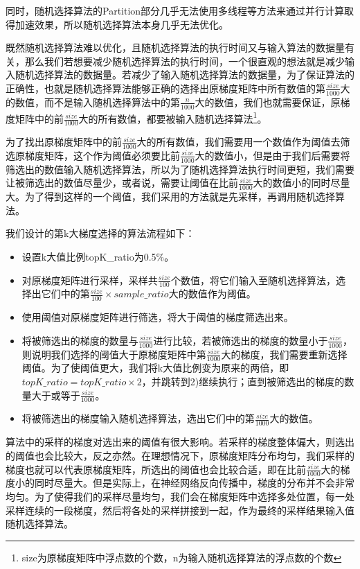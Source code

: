 同时，随机选择算法的Partition部分几乎无法使用多线程等方法来通过并行计算取得加速效果，所以随机选择算法本身几乎无法优化。

既然随机选择算法难以优化，且随机选择算法的执行时间又与输入算法的数据量有关，那么我们若想要减少随机选择算法的执行时间，一个很直观的想法就是减少输入随机选择算法的数据量。若减少了输入随机选择算法的数据量，为了保证算法的正确性，也就是随机选择算法能够正确的选择出原梯度矩阵中所有数值的第$\frac{size}{1000}$大的数值，而不是输入随机选择算法中的第$\frac{n}{1000}$大的数值，我们也就需要保证，原梯度矩阵中的前$\frac{size}{1000}$大的所有数值，都要被输入随机选择算法\footnote{size为原梯度矩阵中浮点数的个数，n为输入随机选择算法的浮点数的个数}。

为了找出原梯度矩阵中的前$\frac{size}{1000}$大的所有数值，我们需要用一个数值作为阈值去筛选原梯度矩阵，这个作为阈值必须要比前$\frac{size}{1000}$大的数值小，但是由于我们后需要将筛选出的数值输入随机选择算法，所以为了随机选择算法执行时间更短，我们需要让被筛选出的数值尽量少，或者说，需要让阈值在比前$\frac{size}{1000}$大的数值小的同时尽量大。为了得到这样的一个阈值，我们采用的方法就是先采样，再调用随机选择算法。

我们设计的第k大梯度选择的算法流程如下：
\begin{itemize}
  \item [1)]
  设置k大值比例topK\_ratio为0.5\%。
  \item [2)]
  对原梯度矩阵进行采样，采样共$\frac{size}{100}$个数值，将它们输入至随机选择算法，选择出它们中的第$\frac{size}{100}\times sample\_ratio$大的数值作为阈值。
  \item [3)]
  使用阈值对原梯度矩阵进行筛选，将大于阈值的梯度筛选出来。
  \item [4)]
  将被筛选出的梯度的数量与$\frac{size}{1000}$进行比较，若被筛选出的梯度的数量小于$\frac{size}{1000}$，则说明我们选择的阈值大于原梯度矩阵中第$\frac{size}{1000}$大的梯度，我们需要重新选择阈值。为了使阈值更大，我们将k大值比例变为原来的两倍，即$topK\_ratio = topK\_ratio \times 2$，并跳转到2)继续执行；直到被筛选出的梯度的数量大于或等于$\frac{size}{1000}$。
  \item [5)]
  将被筛选出的梯度输入随机选择算法，选出它们中的第$\frac{size}{1000}$大的数值。
\end{itemize}

算法中的采样的梯度对选出来的阈值有很大影响。若采样的梯度整体偏大，则选出的阈值也会比较大，反之亦然。在理想情况下，原梯度矩阵分布均匀，我们采样的梯度也就可以代表原梯度矩阵，所选出的阈值也会比较合适，即在比前$\frac{size}{1000}$大的梯度小的同时尽量大。但是实际上，在神经网络反向传播中，梯度的分布并不会非常均匀。为了使得我们的采样尽量均匀，我们会在梯度矩阵中选择多处位置，每一处采样连续的一段梯度，然后将各处的采样拼接到一起，作为最终的采样结果输入值随机选择算法。

